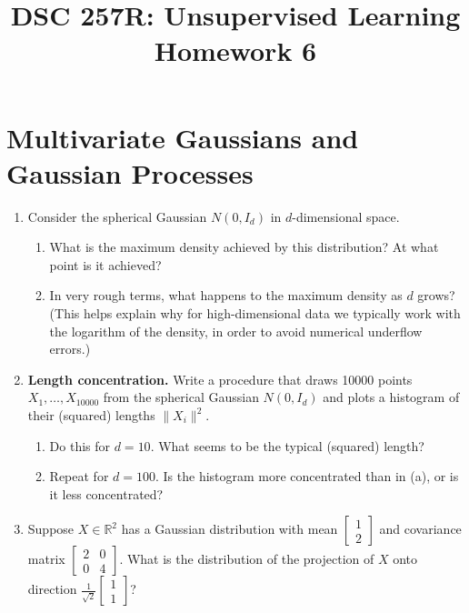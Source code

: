 \documentclass{article}
\title{DSC 257R: Unsupervised Learning \\ Homework 6}
\author{}
\date{}
\begin{document}
\maketitle

\section*{Multivariate Gaussians and Gaussian Processes}

\begin{enumerate}
\item Consider the spherical Gaussian $N(0, I_d)$ in $d$-dimensional space.
    \begin{enumerate}
    \item What is the maximum density achieved by this distribution? At what point is it achieved?
    \item In very rough terms, what happens to the maximum density as $d$ grows? (This helps explain why for high-dimensional data we typically work with the logarithm of the density, in order to avoid numerical underflow errors.)
    \end{enumerate}

\item \textbf{Length concentration.} Write a procedure that draws 10000 points $X_1, \ldots, X_{10000}$ from the spherical Gaussian $N(0, I_d)$ and plots a histogram of their (squared) lengths $\|X_i\|^2$.
    \begin{enumerate}
    \item Do this for $d=10$. What seems to be the typical (squared) length?
    \item Repeat for $d=100$. Is the histogram more concentrated than in (a), or is it less concentrated?
    \end{enumerate}

\item Suppose $X \in \mathbb{R}^2$ has a Gaussian distribution with mean $\begin{bmatrix}1 \\ 2\end{bmatrix}$ and covariance matrix $\begin{bmatrix}2 & 0 \\ 0 & 4\end{bmatrix}$. What is the distribution of the projection of $X$ onto direction $\frac{1}{\sqrt{2}}\begin{bmatrix}1 \\ 1\end{bmatrix}$?


\end{enumerate}
\end{document}
